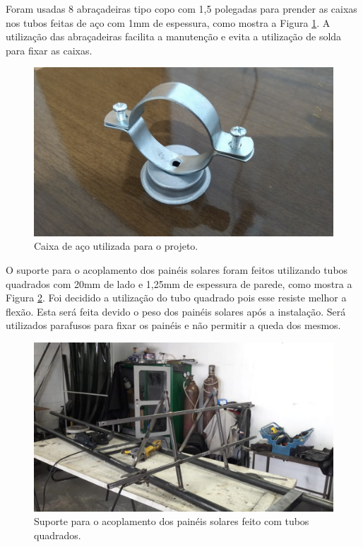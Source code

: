 Foram usadas 8 abraçadeiras tipo copo com 1,5 polegadas para prender as caixas nos tubos feitas de aço com 1mm de espessura, como mostra a Figura \ref{abrac}. A utilização das abraçadeiras facilita a manutenção e evita a utilização de solda para fixar as caixas.

\begin{figure}[H]
	\centering
    \includegraphics[keepaspectratio=true,scale=0.1]{figuras/abrac.jpg}
    \caption{Caixa de aço utilizada para o projeto.}
    \label{abrac}
\end{figure}

O suporte para o acoplamento dos painéis solares foram feitos utilizando tubos quadrados com 20mm de lado e 1,25mm de espessura de parede, como mostra a Figura \ref{tuboquad}. Foi decidido a utilização do tubo quadrado pois esse resiste melhor a flexão. Esta será feita devido o peso dos painéis solares após a instalação. Será utilizados parafusos para fixar os painéis e não permitir a queda dos mesmos. 

\begin{figure}[H]
	\centering
    \includegraphics[keepaspectratio=true,scale=0.3]{figuras/suporte_painel_feito}
    \caption{Suporte para o acoplamento dos painéis solares feito com tubos quadrados.}
    \label{tuboquad}
\end{figure}

